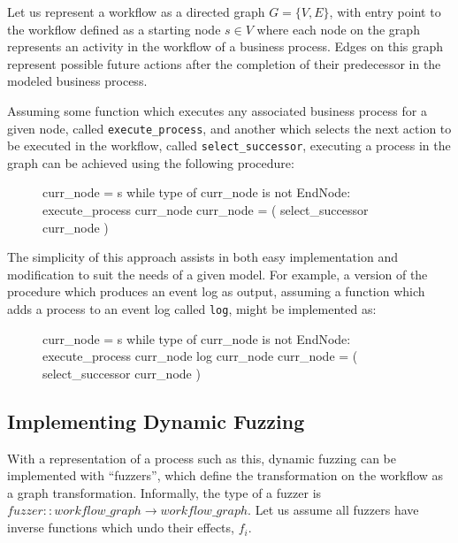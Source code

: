 \documentclass[12pt]{llncs}  %
\begin{document}
Let us represent a workflow as a directed graph $G=\{V, E\}$, with entry point
to the workflow defined as a starting node $s \in{} V$ where each node on the graph
represents an activity in the workflow of a business process. Edges on this
graph represent possible future actions after the completion of their
predecessor in the modeled business process.
\par

Assuming some function which executes any associated business process for a
given node, called \texttt{execute\_process}, and another which selects the next
action to be executed in the workflow, called \texttt{select\_successor}, executing
a process in the graph can be achieved using the following procedure:
\par

\begin{figure}[H]
  \begin{algorithm}
    curr_node = s
    while type of curr_node is not EndNode:
      execute_process curr_node
      curr_node = ( select_successor curr_node )
  \end{algorithm}
\end{figure}

The simplicity of this approach assists in both easy implementation and
modification to suit the needs of a given model. For example, a version of the
procedure which produces an event log as output, assuming a function which adds
a process to an event log called \texttt{log}, might be implemented as:

\begin{figure}[H]
  \begin{algorithm}
    curr_node = s
    while type of curr_node is not EndNode:
      execute_process curr_node
      log curr_node
      curr_node = ( select_successor curr_node )
  \end{algorithm}
\end{figure}
\subsection{Implementing Dynamic Fuzzing}
\label{subsec:example_implementation_details}
With a representation of a process such as this, dynamic fuzzing can be
implemented with ``fuzzers'', which define the transformation on the workflow
as a graph transformation. Informally, the type of a fuzzer is $fuzzer ::
workflow\_graph \rightarrow workflow\_graph$. Let us assume all fuzzers have inverse
functions which undo their effects, $f_i$.
\par
\end{document}
